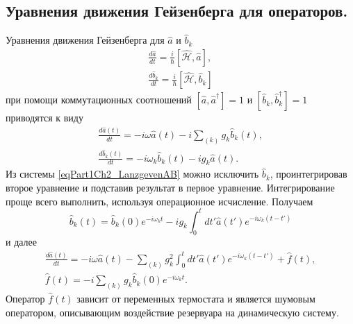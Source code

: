 \subsection{Уравнения движения Гейзенберга для операторов.}
Уравнения движения Гейзенберга для $\hat{a}$ и $\hat{b}_{k}$
\begin{eqnarray}
\frac{d \hat{a}}{d t} = \frac{i}{\hbar}\left[
 \hat{\mathcal{H}}, \hat{a}
\right],
\nonumber \\
\frac{d \hat{b}_k}{d t} = \frac{i}{\hbar}\left[
 \hat{\mathcal{H}}, \hat{b}_k
\right]
\nonumber
\end{eqnarray}
при помощи коммутационных соотношений 
$\left[\hat{a}, \hat{a}^{\dag}\right] = 1$ и 
$\left[\hat{b}_k, \hat{b}_{k}^{\dag}\right] = 1$ приводятся к виду
\begin{eqnarray}
\frac{d \hat{a}\left(t\right)}{d t} = -i \omega \hat{a}\left(t\right) - i\sum_{(k)}g_k
\hat{b}_k\left(t\right),
\nonumber \\
\frac{d \hat{b}_k\left(t\right)}{d t} = -i \omega_k
\hat{b}_{k}\left(t\right) - i g_k \hat{a}\left(t\right).
\label{eqPart1Ch2_LanzgevenAB}
\end{eqnarray}
Из системы \eqref{eqPart1Ch2_LanzgevenAB} можно исключить $\hat{b}_k$,
проинтегрировав второе уравнение и подставив результат в первое
уравнение. Интегрирование проще всего выполнить, используя операционное
исчисление. Получаем
\begin{equation}
\hat{b}_k\left(t\right) = 
\hat{b}_k\left(0\right) e^{-i \omega_k t} 
- i g_k \int_0^t d t' \hat{a}\left(t'\right)e^{-i \omega_k\left(t - t'\right)}
\nonumber
\end{equation}
и далее
\begin{eqnarray}
\frac{d \hat{a}\left(t\right)}{dt} = 
- i \omega \hat{a}\left(t\right) - \sum_{(k)} g_k^2 \int_0^t
d t'  \hat{a}\left(t'\right)e^{-i \omega_k\left(t - t'\right)}
+ \hat{f}\left(t\right),
\nonumber \\
\hat{f}\left(t\right) = -i \sum_{(k)} g_k \hat{b}_k\left(0\right)
e^{-i \omega_k t}.
\label{eqPart1Ch2_LanzgevenA}
\end{eqnarray}
Оператор $\hat{f}\left(t\right)$ зависит от переменных термостата и
является шумовым оператором, описывающим воздействие резервуара на
динамическую систему.

